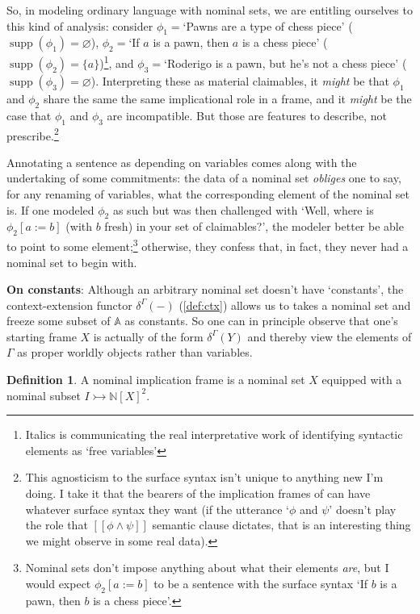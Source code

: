 \documentclass{article}
\theoremstyle{definition}
\newtheorem{definition}{Definition}[section]
\newcommand{\N}{\mathbb{N}}
\newcommand{\A}{\mathbb{A}}
\newcommand{\bbrack}[1]{[\![ #1 ]\!]}
\newcommand{\supp}{\operatorname{supp}}
\begin{document}
So, in modeling ordinary language with nominal sets, we are entitling ourselves to this kind of analysis: consider $\phi_1=$`Pawns are a type of chess piece' ($\supp(\phi_1)=\varnothing$), $\phi_2=$`If $a$ is a pawn, then $a$ is a chess piece' ($\supp(\phi_2)=\{a\}$)\footnote{Italics is communicating the real interpretative work of identifying syntactic elements as `free variables'}, and $\phi_3=$`Roderigo is a pawn, but he's not a chess piece' ($\supp(\phi_3)=\varnothing$). Interpreting these as material claimables, it {\it might} be that $\phi_1$ and $\phi_2$ share the same the same implicational role in a frame, and it {\it might} be the case that $\phi_1$ and $\phi_3$ are incompatible. But those are features to describe, not prescribe.\footnote{This agnosticism to the surface syntax isn't unique to anything new I'm doing. I take it that the bearers of the implication frames of \cite{hlobil2025reasons} can have whatever surface syntax they want (if the utterance `$\phi$ and $\psi$' doesn't play the role that $\bbrack{\phi \wedge \psi}$ semantic clause dictates, that is an interesting thing we might observe in some real data).
}

Annotating a sentence as depending on variables comes along with the undertaking of some commitments: the data of a nominal set {\it obliges} one to say, for any renaming of variables, what the corresponding element of the nominal set is. If one modeled $\phi_2$ as such but was then challenged with `Well, where is $\phi_2[a:=b]$ (with $b$ fresh) in your set of claimables?', the modeler better be able to point to some element;\footnote{Nominal sets don't impose anything about what their elements {\it are}, but I would expect $\phi_2[a:=b]$ to be a sentence with the surface syntax `If $b$ is a pawn, then $b$ is a chess piece'.} otherwise, they confess that, in fact, they never had a nominal set to begin with.


{\bf On constants}: Although an arbitrary nominal set doesn't have `constants', the context-extension functor $\delta^\Gamma(-)$ (\cref{def:ctx}) allows us to takes a nominal set and freeze some subset of $\A$ as constants. So one can in principle observe that one's starting frame $X$ is actually of the form $\delta^\Gamma(Y)$ and thereby view the elements of $\Gamma$ as proper worldly objects rather than variables.

\begin{definition}
    \label{def:nomif}
    A nominal implication frame is a nominal set $X$ equipped with a nominal subset $I\rightarrowtail \N[X]^2$.
\end{definition}
\end{document}
